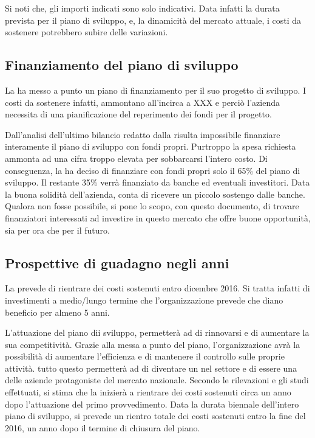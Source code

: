 Si noti che, gli importi indicati sono solo indicativi. Data infatti la durata prevista per il piano di sviluppo, e, la dinamicità del mercato attuale, i costi da sostenere potrebbero subire delle variazioni. 
 

\subsection{Finanziamento del piano di sviluppo}

La \customer ha messo a punto un piano di finanziamento per il suo progetto di sviluppo. I costi da sostenere infatti, ammontano all'incirca a XXX \text{\euro}  %
e perciò l'azienda necessita di una pianificazione del reperimento dei fondi per il progetto.

Dall'analisi dell'ultimo bilancio redatto dalla \customer risulta impossibile finanziare interamente il piano di sviluppo con fondi propri. Purtroppo la spesa richiesta ammonta ad una cifra troppo elevata per sobbarcarsi l'intero costo.  Di conseguenza, la \customer ha deciso di finanziare con fondi propri solo il 65\% del piano di sviluppo. Il restante 35\% verrà finanziato da banche ed eventuali investitori. Data la buona solidità dell'azienda, \customer conta di ricevere un piccolo sostengo dalle banche. Qualora non fosse possibile, \customer si pone lo scopo, con questo documento, di trovare finanziatori interessati ad investire in questo mercato che offre buone opportunità, sia per ora che per il futuro.
\subsection{ Prospettive di guadagno negli anni}
La \customer prevede di rientrare dei costi sostenuti entro dicembre 2016. Si tratta infatti di investimenti a medio/lungo termine che l'organizzazione prevede che diano beneficio per almeno 5 anni.

L'attuazione del piano dii sviluppo, permetterà ad  \customer di rinnovarsi e di aumentare la sua competitività. Grazie alla messa a punto del piano, l'organizzazione avrà la possibilità di aumentare l'efficienza e di mantenere il controllo sulle proprie attività. tutto questo permetterà ad \customer di diventare un  nel settore e di essere una delle aziende protagoniste del mercato nazionale. 
Secondo le rilevazioni e gli studi effettuati, si stima che la \customer inizierà a rientrare dei costi sostenuti circa un anno dopo l'attuazione del primo provvedimento. Data la durata biennale dell'intero piano di sviluppo, si prevede un rientro totale dei costi sostenuti entro la fine del 2016, un anno dopo il termine di chiusura del piano.

